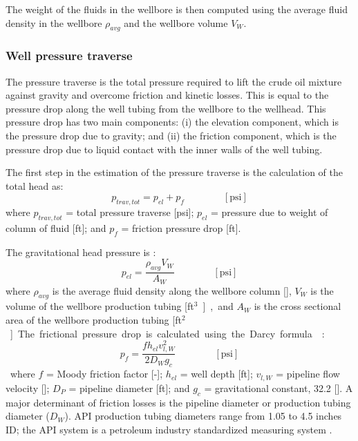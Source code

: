 \documentclass[11pt]{report}
\newcommand{\eqnunit}[1]{\quad\quad \scriptstyle{\left[\text{#1}\right]}}
\begin{document}
The weight of the fluids in the wellbore is then computed using the average fluid density in the wellbore $\rho_{avg}$ and the wellbore volume $V_W$.

\subsubsection{Well pressure traverse}

The pressure traverse is the total pressure required to lift the crude oil mixture against gravity and overcome friction and kinetic losses. This is equal to the pressure drop along the well tubing from the wellbore to the wellhead. This pressure drop has two main components: (i) the elevation component, which is the pressure drop due to gravity; and (ii) the friction component, which is the pressure drop due to liquid contact with the inner walls of the well tubing.


The first step in the estimation of the pressure traverse is the calculation of the total head as: 
\begin{equation} \label{eq:total_head}
p_{trav,tot}= p_{el} + p_{f} \quad\quad\eqnunit{psi}
\end{equation}
where $p_{trav,tot}$ = total pressure traverse [\unit{psi}]; $p_{el}$ = pressure due to weight of column of fluid [\unit{ft}]; and $p_{f}$ = friction pressure drop [\unit{ft}]. 

The gravitational head pressure is \cite[Table 1, p. 455]{Mcallister2009}:
\begin{equation} \label{eq:pressure_traverse}
p_{el} = \frac{\rho_{avg} V_{W}}{A_W}  \quad\quad\eqnunit{psi}
\end{equation}
where $\rho_{avg}$ is the average fluid density along the wellbore column [], $V_{W}$ is the volume of the wellbore production tubing [\unit{ft$^3$}], and $A_W$ is the cross sectional area of the wellbore production tubing [\unit{ft$^2$}].

The frictional pressure drop is calculated using the Darcy formula \cite[p. 447]{Mcallister2009}:
\begin{equation} \label{eq:friction_head}
p_{f}=\frac{fh_{el}{v_{l,W}^2}}{2D_{W}{g_{c}}} \quad\quad\eqnunit{psi}
\end{equation}
where $f$ = Moody friction factor [-]; $h_{el}$ = well depth [\unit{ft}]; $v_{l,W}$ = pipeline flow velocity []; $D_{P}$ = pipeline diameter [\unit{ft}]; and $g_{c}$ = gravitational constant, 32.2 []. A major determinant of friction losses is the pipeline diameter or production tubing diameter ($D_{W}$). API production tubing diameters range from 1.05 to 4.5 inches ID; the API system is a petroleum industry standardized measuring system \cite[p. 106]{Clegg2007}.
\end{document}
